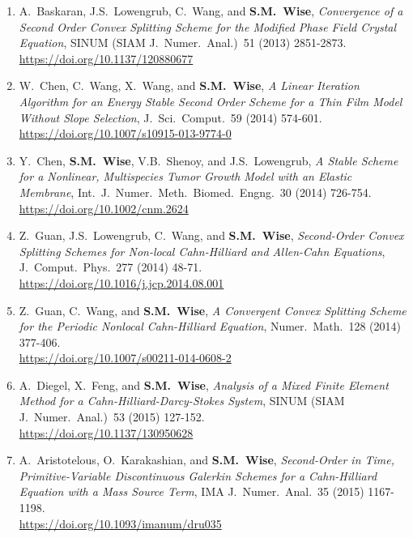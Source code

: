 \documentclass[11pt]{letter}
\begin{document}
\begin{enumerate}
    \item
A.~Baskaran, J.S.~Lowengrub, C.~Wang, and \textbf{S.M.~Wise}, {\sl Convergence of a Second Order Convex Splitting Scheme for the Modified Phase Field Crystal Equation}, SINUM (SIAM J.~Numer.~Anal.)~51 (2013) 2851-2873.
	\\
\url{https://doi.org/10.1137/120880677}

    \item
W.~Chen, C.~Wang, X.~Wang, and \textbf{S.M.~Wise}, {\sl A Linear Iteration Algorithm for an Energy Stable Second Order Scheme for a Thin Film Model Without Slope Selection}, J.~Sci.~Comput.~59 (2014) 574-601.
	\\
\url{https://doi.org/10.1007/s10915-013-9774-0}

    \item
Y.~Chen, \textbf{S.M.~Wise}, V.B.~Shenoy, and J.S.~Lowengrub, {\sl A Stable Scheme for a Nonlinear, Multispecies Tumor Growth Model with an Elastic Membrane}, Int.~J.~Numer.~Meth.~Biomed.~Engng.~30 (2014) 726-754.
	\\ 
\url{https://doi.org/10.1002/cnm.2624}

	\item
Z.~Guan, J.S.~Lowengrub, C.~Wang, and \textbf{S.M.~Wise}, {\sl Second-Order Convex Splitting Schemes for Non-local Cahn-Hilliard and Allen-Cahn Equations}, J.~Comput.~Phys.~277 (2014) 48-71.
	\\ 
\url{https://doi.org/10.1016/j.jcp.2014.08.001}

	\item
Z.~Guan, C.~Wang, and \textbf{S.M.~Wise}, {\sl A Convergent Convex Splitting Scheme for the Periodic Nonlocal Cahn-Hilliard Equation}, Numer.~Math.~128 (2014) 377-406.
	\\ 
\url{https://doi.org/10.1007/s00211-014-0608-2}

	\item
A.~Diegel, X.~Feng, and \textbf{S.M.~Wise}, {\sl Analysis of a Mixed Finite Element Method for a Cahn-Hilliard-Darcy-Stokes System}, SINUM (SIAM J.~Numer.~Anal.)~53 (2015) 127-152.
	\\ 
\url{https://doi.org/10.1137/130950628}

	\item
A.~Aristotelous, O.~Karakashian, and \textbf{S.M.~Wise}, {\sl Second-Order in Time, Primitive-Variable Discontinuous Galerkin Schemes for a Cahn-Hilliard Equation with a Mass Source Term}, IMA J.~Numer.~Anal.~35 (2015) 1167-1198.
	\\ 
\url{https://doi.org/10.1093/imanum/dru035} 


\end{enumerate}
\end{document}
